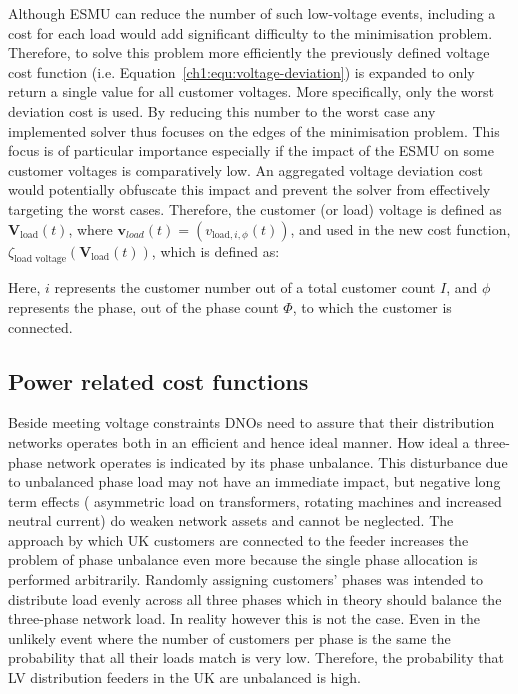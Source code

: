 Although ESMU can reduce the number of such low-voltage events, including a cost for each load would add significant difficulty to the minimisation problem.
Therefore, to solve this problem more efficiently the previously defined voltage cost function (i.e. Equation~\ref{ch1:equ:voltage-deviation}) is expanded to only return a single value for all customer voltages.
More specifically, only the worst deviation cost is used.
By reducing this number to the worst case any implemented solver thus focuses on the edges of the minimisation problem.
This focus is of particular importance especially if the impact of the ESMU on some customer voltages is comparatively low.
An aggregated voltage deviation cost would potentially obfuscate this impact and prevent the solver from effectively targeting the worst cases.
Therefore, the customer (or load) voltage is defined as $\textbf{V}_\text{load}(t)$, where $\textbf{v}_{load}(t) = (v_{\text{load},i,\phi}(t))$, and used in the new cost function, $\zeta_\text{load voltage}(\textbf{V}_\text{load}(t))$, which is defined as:



Here, $i$ represents the customer number out of a total customer count $I$, and $\phi$ represents the phase, out of the phase count $\Phi$, to which the customer is connected.

\subsection{Power related cost functions}
\label{ch1:subsec:powers-related-cost-functions}

Beside meeting voltage constraints DNOs need to assure that their distribution networks operates both in an efficient and hence ideal manner.
How ideal a three-phase network operates is indicated by its phase unbalance.
This disturbance due to unbalanced phase load may not have an immediate impact, but negative long term effects ( asymmetric load on transformers, rotating machines and increased neutral current) do weaken network assets and cannot be neglected.
The approach by which UK customers are connected to the feeder increases the problem of phase unbalance even more because the single phase allocation is performed arbitrarily.
Randomly assigning customers' phases was intended to distribute load evenly across all three phases which in theory should balance the three-phase network load.
In reality however this is not the case.
Even in the unlikely event where the number of customers per phase is the same the probability that all their loads match is very low.
Therefore, the probability that LV distribution feeders in the UK are unbalanced is high.

